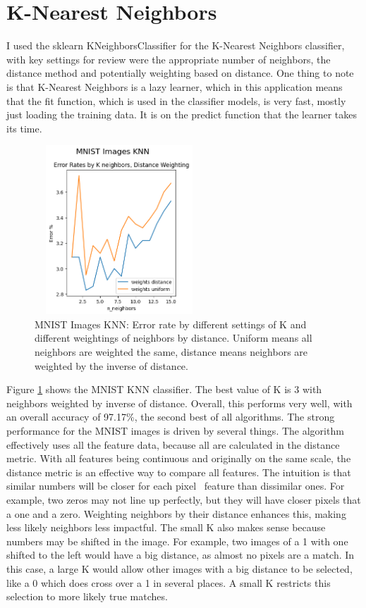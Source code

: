 \documentclass[letterpaper]{article} %
\begin{document}
\section{K-Nearest Neighbors}
I used the sklearn KNeighborsClassifier for the K-Nearest Neighbors classifier, with key settings for review were the appropriate number of neighbors, the distance method and potentially weighting based on distance.  One thing to note is that K-Nearest Neighbors is a lazy learner, which in this application means that the fit function, which is used in the classifier models, is very fast, mostly just loading the training data.  It is on the predict function that the learner takes its time.


\begin{figure}[h]
\centering
\includegraphics[width=2.5in, height=2.5in]{figures/MNIST_Images_KNN_knn_1.png}
\caption{MNIST Images KNN:  Error rate by different settings of K and different weightings of neighbors by distance.  Uniform means all neighbors are weighted the same, distance means neighbors are weighted by the inverse of distance.  }
\label{fig:mnist_knn_1}
\end{figure}

Figure \ref{fig:mnist_knn_1} shows the MNIST KNN classifier.  The best value of K is 3 with neighbors weighted by inverse of distance.  Overall, this performs very well, with an overall accuracy of 97.17\%, the second best of all algorithms.  The strong performance for the MNIST images is driven by several things.  The algorithm effectively uses all the feature data, because all are calculated in the distance metric.  With all features being continuous and originally on the same scale, the distance metric is an effective way to compare all features.  The intuition is that similar numbers will be closer for each pixel \ feature than dissimilar ones.  For example, two zeros may not line up perfectly, but they will have closer pixels that a one and a zero.  Weighting neighbors by their distance enhances this, making less likely neighbors less impactful.   The small K also makes sense because numbers may be shifted in the image. For example, two images of a 1 with one shifted to the left would have a big distance, as almost no pixels are a match.  In this case, a large K would allow other images with a big distance to be selected, like a 0 which does cross over a 1 in several places.  A small K restricts this selection to more likely true matches.
\end{document}
